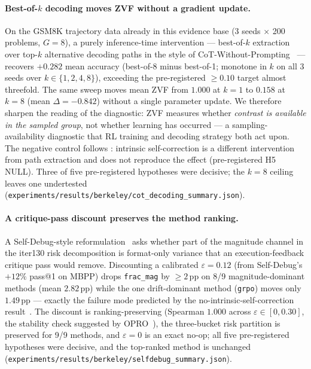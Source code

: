 \documentclass{article}
\begin{document}
\paragraph{Best-of-$k$ decoding moves ZVF without a gradient update.}
On the GSM8K trajectory data already in this evidence base (3 seeds
$\times$ 200 problems, $G{=}8$), a purely inference-time intervention ---
best-of-$k$ extraction over top-$k$ alternative decoding paths in the
style of CoT-Without-Prompting~\citep{wang2024cotdecoding} --- recovers
$+0.282$ mean accuracy (best-of-8 minus best-of-1; monotone in $k$ on
all 3 seeds over $k \in \{1,2,4,8\}$), exceeding the pre-registered
$\geq 0.10$ target almost threefold. The same sweep moves mean ZVF from
$1.000$ at $k{=}1$ to $0.158$ at $k{=}8$ (mean $\Delta = -0.842$)
without a single parameter update. We therefore sharpen the reading of
the diagnostic: ZVF measures whether \emph{contrast is available in the
sampled group}, not whether learning has occurred --- a sampling-availability
diagnostic that RL training and decoding strategy both act upon. The
negative control follows \citet{huang2024selfcorrect}: intrinsic
self-correction is a different intervention from path extraction and
does not reproduce the effect (pre-registered H5 NULL). Three of five
pre-registered hypotheses were decisive; the $k{=}8$ ceiling leaves one
undertested
(\texttt{experiments/results/berkeley/cot\_decoding\_summary.json}).

\paragraph{A critique-pass discount preserves the method ranking.}
A Self-Debug-style reformulation~\citep{chen2023selfdebug} asks whether
part of the magnitude channel in the iter130 risk decomposition is
format-only variance that an execution-feedback critique pass would
remove. Discounting a calibrated $\varepsilon = 0.12$ (from Self-Debug's
$+12\%$ pass@1 on MBPP) drops \texttt{frac\_mag} by $\geq 2$\,pp on 8/9
magnitude-dominant methods (mean $2.82$\,pp) while the one
drift-dominant method (\texttt{grpo}) moves only $1.49$\,pp --- exactly
the failure mode predicted by the no-intrinsic-self-correction
result~\citep{huang2024selfcorrect}. The discount is ranking-preserving
(Spearman $1.000$ across $\varepsilon \in [0, 0.30]$, the stability
check suggested by OPRO~\citep{yang2024opro}), the three-bucket risk
partition is preserved for 9/9 methods, and $\varepsilon = 0$ is an
exact no-op; all five pre-registered hypotheses were decisive, and the
top-ranked method is unchanged
(\texttt{experiments/results/berkeley/selfdebug\_summary.json}).
\end{document}
